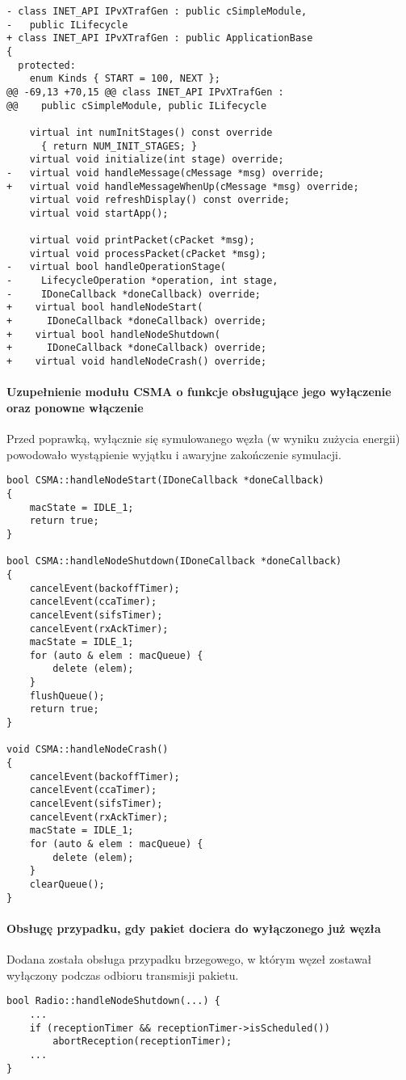 \begin{verbatim}
- class INET_API IPvXTrafGen : public cSimpleModule,
-   public ILifecycle
+ class INET_API IPvXTrafGen : public ApplicationBase
{
  protected:
    enum Kinds { START = 100, NEXT };
@@ -69,13 +70,15 @@ class INET_API IPvXTrafGen :
@@    public cSimpleModule, public ILifecycle

    virtual int numInitStages() const override
      { return NUM_INIT_STAGES; }
    virtual void initialize(int stage) override;
-   virtual void handleMessage(cMessage *msg) override;
+   virtual void handleMessageWhenUp(cMessage *msg) override;
    virtual void refreshDisplay() const override;
    virtual void startApp();

    virtual void printPacket(cPacket *msg);
    virtual void processPacket(cPacket *msg);
-   virtual bool handleOperationStage(
-     LifecycleOperation *operation, int stage,
-     IDoneCallback *doneCallback) override;
+    virtual bool handleNodeStart(
+      IDoneCallback *doneCallback) override;
+    virtual bool handleNodeShutdown(
+      IDoneCallback *doneCallback) override;
+    virtual void handleNodeCrash() override;
\end{verbatim}

\paragraph{Uzupełnienie modułu CSMA o funkcje obsługujące jego wyłączenie oraz ponowne włączenie} Przed poprawką, wyłącznie się symulowanego węzła (w wyniku zużycia energii) powodowało wystąpienie wyjątku i awaryjne zakończenie symulacji.

\begin{verbatim}
bool CSMA::handleNodeStart(IDoneCallback *doneCallback)
{
    macState = IDLE_1;
    return true;
}

bool CSMA::handleNodeShutdown(IDoneCallback *doneCallback)
{
    cancelEvent(backoffTimer);
    cancelEvent(ccaTimer);
    cancelEvent(sifsTimer);
    cancelEvent(rxAckTimer);
    macState = IDLE_1;
    for (auto & elem : macQueue) {
        delete (elem);
    }
    flushQueue();
    return true;
}

void CSMA::handleNodeCrash()
{
    cancelEvent(backoffTimer);
    cancelEvent(ccaTimer);
    cancelEvent(sifsTimer);
    cancelEvent(rxAckTimer);
    macState = IDLE_1;
    for (auto & elem : macQueue) {
        delete (elem);
    }
    clearQueue();
}
\end{verbatim}

\paragraph{Obsługę przypadku, gdy pakiet dociera do wyłączonego już węzła} Dodana została obsługa przypadku brzegowego, w którym węzeł zostawał wyłączony podczas odbioru transmisji pakietu.
\begin{verbatim}
bool Radio::handleNodeShutdown(...) {
    ...
    if (receptionTimer && receptionTimer->isScheduled())
        abortReception(receptionTimer);
    ...
}
\end{verbatim}